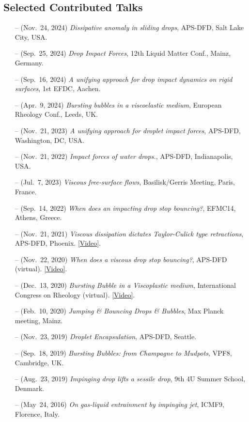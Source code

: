 \documentclass[10pt,a4paper,colorlinks,linkcolor=blue,urlcolor=blue,citecolor=blue]{moderncv}
\begin{document}
\subsection{Selected Contributed Talks}
\begin{itemize}[leftmargin=1.25em]
\item[--] (Nov.~24, 2024) \emph{Dissipative anomaly in sliding drops}, APS-DFD, Salt Lake City, USA.
\item[--] (Sep.~25, 2024) \emph{Drop Impact Forces}, 12th Liquid Matter Conf., Mainz, Germany.
\item[--] (Sep.~16, 2024) \emph{A unifying approach for drop impact dynamics on rigid surfaces}, 1st EFDC, Aachen.
\item[--] (Apr.~9, 2024) \emph{Bursting bubbles in a viscoelastic medium}, European Rheology Conf., Leeds, UK.
\item[--] (Nov.~21, 2023) \emph{A unifying approach for droplet impact forces}, APS-DFD, Washington, DC, USA.
\item[--] (Nov.~21, 2022) \emph{Impact forces of water drops.}, APS-DFD, Indianapolis, USA.
\item[--] (Jul.~7, 2023) \emph{Viscous free-surface flows}, Basilisk/Gerris Meeting, Paris, France.
\item[--] (Sep.~14, 2022) \emph{When does an impacting drop stop bouncing?}, EFMC14, Athens, Greece.
\item[--] (Nov.~21, 2021) \emph{Viscous dissipation dictates Taylor-Culick type retractions}, APS-DFD, Phoenix. \href{https://youtu.be/d0tMlpbMIqY?si=V-7Lh5g-zj1j7al6}{[Video]}.
\item[--] (Nov.~22, 2020) \emph{When does a viscous drop stop bouncing?}, APS-DFD (virtual). \href{https://youtu.be/9JCV9JFwr2A?si=Vs1ljwdmZrzHUOXX}{[Video]}.
\item[--] (Dec.~13, 2020) \emph{Bursting Bubble in a Viscoplastic medium}, International Congress on Rheology (virtual). \href{https://youtu.be/52D6nfaHbYg?si=lE3oQGiMZe3UCT6j}{[Video]}.
\item[--] (Feb.~10, 2020) \emph{Jumping \& Bouncing Drops \& Bubbles}, Max Planck meeting, Mainz.
\item[--] (Nov.~23, 2019) \emph{Droplet Encapsulation}, APS-DFD, Seattle.
\item[--] (Sep.~18, 2019) \emph{Bursting Bubbles: from Champagne to Mudpots}, VPF8, Cambridge, UK.
\item[--] (Aug.~23, 2019) \emph{Impinging drop lifts a sessile drop}, 9th 4U Summer School, Denmark.
\item[--] (May~24, 2016) \emph{On gas-liquid entrainment by impinging jet}, ICMF9, Florence, Italy.
\end{itemize}
\end{document}
